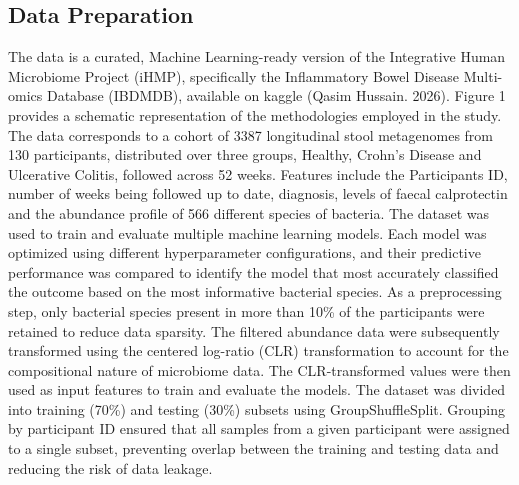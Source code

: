 \documentclass[twoside,twocolumn,10pt]{article}
\begin{document}
\subsection{Data Preparation}
The data is a curated, Machine Learning-ready version of the Integrative Human Microbiome Project (iHMP), specifically the Inflammatory Bowel Disease Multi-omics Database (IBDMDB), available on kaggle (Qasim Hussain. 2026). Figure 1 provides a schematic representation of the methodologies employed in the study. The data corresponds to a cohort of 3387 longitudinal stool metagenomes from 130 participants, distributed over three groups, Healthy, Crohn’s Disease and Ulcerative Colitis, followed across 52 weeks. Features include the Participants ID, number of weeks being followed up to date, diagnosis, levels of faecal calprotectin and the abundance profile of 566 different species of bacteria. The dataset was used to train and evaluate multiple machine learning models. Each model was optimized using different hyperparameter configurations, and their predictive performance was compared to identify the model that most accurately classified the outcome based on the most informative bacterial species. As a preprocessing step, only bacterial species present in more than 10\% of the participants were retained to reduce data sparsity. The filtered abundance data were subsequently transformed using the centered log-ratio (CLR) transformation to account for the compositional nature of microbiome data. The CLR-transformed values were then used as input features to train and evaluate the models. The dataset was divided into training (70\%) and testing (30\%) subsets using GroupShuffleSplit. Grouping by participant ID ensured that all samples from a given participant were assigned to a single subset, preventing overlap between the training and testing data and reducing the risk of data leakage.  
\end{document}
